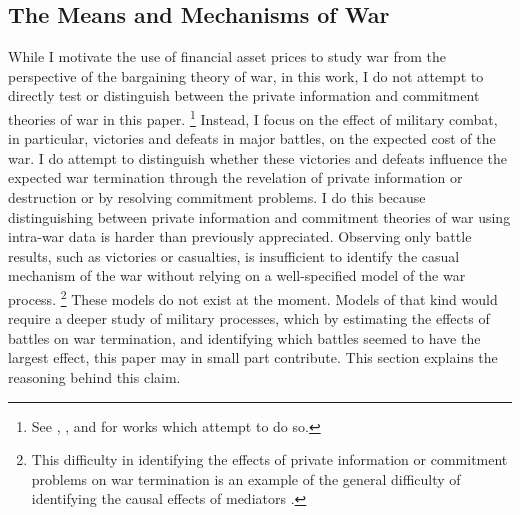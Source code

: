 \subsection{The Means and Mechanisms of War}
\label{sec:means-mechanisms-war}

While I motivate the use of financial asset prices to study war from the perspective of the bargaining theory of war, in this work, I do not attempt to directly test or distinguish between the private information and commitment theories of war in this paper.%
\footnote{See \textcite{Ramsay2008}, \textcite{Weisiger2015}, and \textcite{Reiter2009} for works which attempt to do so.}
Instead, I focus on the effect of military combat, in particular, victories and defeats in major battles, on the expected cost of the war.
I do attempt to distinguish whether these victories and defeats influence the expected war termination through the revelation of private information or destruction or by resolving commitment problems.
I do this because distinguishing between private information and commitment theories of war using intra-war data is harder than previously appreciated.
Observing only battle results, such as victories or casualties, is insufficient to identify the casual mechanism of the war without relying on a well-specified model of the war process.%
\footnote{This difficulty in identifying the effects of private information or commitment problems on war termination is an example of the general difficulty of identifying the causal effects of mediators \parencite{Keele2015a}.}
These models do not exist at the moment.
Models of that kind would require a deeper study of military processes, which by estimating the effects of battles on war termination, and identifying which battles seemed to have the largest effect, this paper may in small part contribute.
This section explains the reasoning behind this claim.

